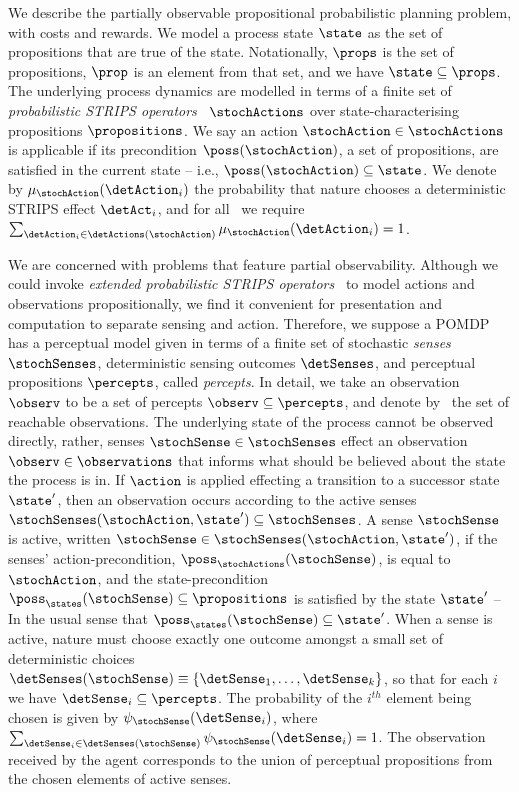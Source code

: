 
We describe the partially observable propositional probabilistic
planning problem, with costs and rewards. We model a process state
$\state$ as the set of propositions that are true of the
state. Notationally, $\props$ is the set of propositions, $\prop$ is
an element from that set, and we have $\state \subseteq
\props$. The underlying process
dynamics are modelled in terms of a finite set of {\em probabilistic
STRIPS operators}~\cite{boutilier:abstraction} $\stochActions$ over
state-characterising propositions $\propositions$.
We say an action $\stochAction \in \stochActions$ is
applicable if its precondition $\poss(\stochAction)$, a set of
propositions, are satisfied in the current state -- i.e., $\poss(\stochAction) \subseteq
\state$. We denote by $\mu_{\stochAction}(\detAction_i)$ the probability that
nature chooses a deterministic STRIPS effect $\detAct_i$, and for
all \stochAction\ we require
$\sum_{\detAction_i \in \detActions(\stochAction)}
\mu_{\stochAction}(\detAction_i) = 1$.

We are concerned with problems that feature partial
observability. Although we could invoke {\em extended probabilistic
STRIPS operators}~\cite{rintanen:01} to model actions and observations
propositionally, we find it convenient for presentation and computation to
separate sensing and action. Therefore, we suppose a POMDP has a
perceptual model given in terms of a finite set of stochastic {\em
senses} $\stochSenses$, deterministic sensing outcomes $\detSenses$,
and perceptual propositions $\percepts$, called {\em percepts}. In
detail, we take an observation $\observ$ to be a set of percepts
$\observ \subseteq \percepts$, and denote by \observations\ the set of
reachable observations. The underlying state of the process cannot be
observed directly, rather, senses $\stochSense \in \stochSenses$
effect an observation $\observ \in
\observations$ that informs what should be believed about the state the
process is in. If $\action$ is applied effecting a
transition to a successor state $\state'$, then an observation occurs
according to the active senses $\stochSenses(\stochAction, \state')
\subseteq \stochSenses$. A sense $\stochSense$ is active, written
$\stochSense \in \stochSenses(\stochAction, \state')$, if the senses'
action-precondition, $\poss_\stochActions(\stochSense)$, is equal to
$\stochAction$, and the state-precondition $\poss_\states(\stochSense)
\subseteq \propositions$ is satisfied by the state $\state'$ -- In the
usual sense that \mbox{$\poss_\states(\stochSense)\subseteq\state'$}.
When a sense is active, nature must choose exactly one outcome amongst
a small set of deterministic choices $\detSenses(\stochSense)
\equiv \{\detSense_1, \ldots, \detSense_k \}$, so that for each
$i$ we have $\detSense_i \subseteq \percepts$. The probability of
the $i^{th}$ element being chosen is given by
$\psi_{\stochSense}(\detSense_i)$, where $\sum_{\detSense_i \in
\detSenses(\stochSense)} \psi_{\stochSense}(\detSense_i) =
1$. The observation received by the agent corresponds to the union of
perceptual propositions from the chosen elements of active
senses.

